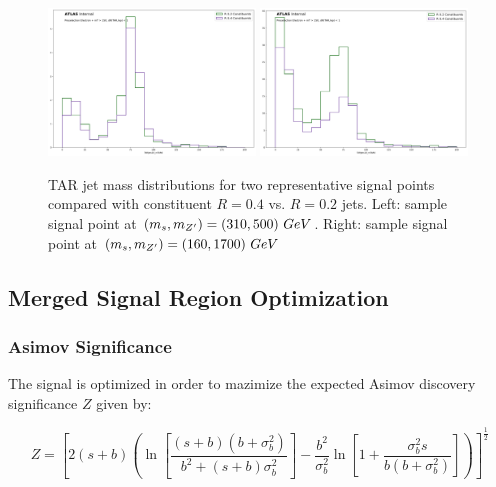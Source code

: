 \begin{figure}[htpb]
  \centering
     \includegraphics[width = 0.49\textwidth]{Figures/4/TAR/04_monoSww_semilep_zp500_dm200_dh310.png}
     \includegraphics[width = 0.49\textwidth]{Figures/4/TAR/04_monoSww_semilep_zp1700_dm200_dh160.png}

     \caption{TAR jet mass distributions for two representative signal points compared with constituent \akt $R=0.4$ vs. \akt $R=0.2$ jets. Left: sample signal point at $(m_s, m_{Z^\prime})=(310, 500)~GeV$. Right: sample signal point at $(m_s, m_{Z^\prime})=(160, 1700)~GeV$}
     \label{fig:R04_TAR_plots}
\end{figure}


\subsection{Merged Signal Region Optimization}
\subsubsection{Asimov Significance}
The \merged signal is optimized in order to mazimize the expected Asimov discovery significance $Z$ given by:

\begin{equation}
  Z = \left[ 2(s+b)\left(
    \ln\left[ \frac{(s+b)(b+\sigma_b^2)}{b^2 + (s+b)\sigma_b^2} \right]
    - \frac{b^2}{\sigma_b^2}\ln\left[ 1 + \frac{\sigma_b^2 s}{b(b+\sigma_b^2)} \right]
  \right) \right]^\frac{1}{2}
  \label{eq:asimov}
\end{equation}


